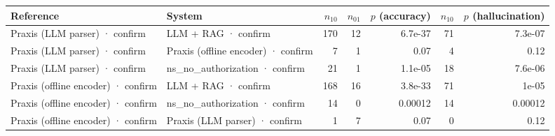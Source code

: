 \begin{tabular}{llrrrrr}
\toprule
Reference & System & $n_{10}$ & $n_{01}$ & $p$ (accuracy) & $n_{10}$ & $p$ (hallucination) \\
\midrule
Praxis (LLM parser) · confirm & LLM + RAG · confirm & 170 & 12 & 6.7e-37 & 71 & 7.3e-07 \\
Praxis (LLM parser) · confirm & Praxis (offline encoder) · confirm & 7 & 1 & 0.07 & 4 & 0.12 \\
Praxis (LLM parser) · confirm & ns_no_authorization · confirm & 21 & 1 & 1.1e-05 & 18 & 7.6e-06 \\
Praxis (offline encoder) · confirm & LLM + RAG · confirm & 168 & 16 & 3.8e-33 & 71 & 1e-05 \\
Praxis (offline encoder) · confirm & ns_no_authorization · confirm & 14 & 0 & 0.00012 & 14 & 0.00012 \\
Praxis (offline encoder) · confirm & Praxis (LLM parser) · confirm & 1 & 7 & 0.07 & 0 & 0.12 \\
\bottomrule
\end{tabular}
